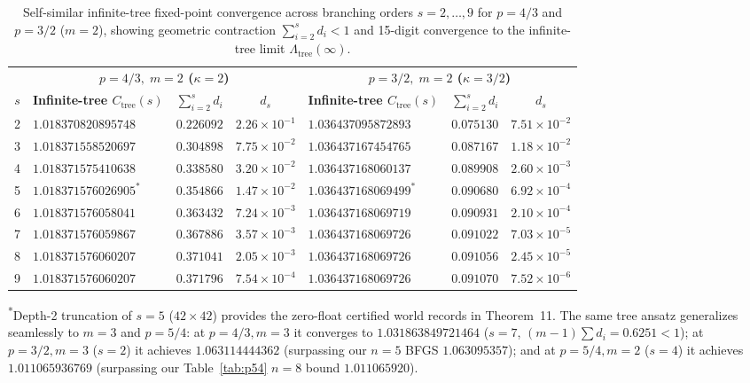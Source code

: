 \documentclass[10pt,letterpaper]{article}
\begin{document}
\begin{table}[htbp]
\centering
\caption{\small Self-similar infinite-tree fixed-point convergence across branching orders $s = 2,\dots,9$ for $p = 4/3$ and $p = 3/2$ ($m = 2$), showing geometric contraction $\sum_{i=2}^s d_i < 1$ and 15-digit convergence to the infinite-tree limit $\Lambda_{\mathrm{tree}}(\infty)$.}
\vspace{3pt}
\footnotesize
\begin{tabular}{@{}c | l c c | l c c@{}}
\toprule
 & \multicolumn{3}{c|}{\textbf{$p = 4/3,\; m = 2$ ($\kappa = 2$)}} & \multicolumn{3}{c}{\textbf{$p = 3/2,\; m = 2$ ($\kappa = 3/2$)}} \\
\textbf{$s$} & \textbf{Infinite-tree $C_{\mathrm{tree}}(s)$} & \textbf{$\sum_{i=2}^s d_i$} & \textbf{$d_s$} & \textbf{Infinite-tree $C_{\mathrm{tree}}(s)$} & \textbf{$\sum_{i=2}^s d_i$} & \textbf{$d_s$} \\
\midrule
2 & $1.018370820895748$ & $0.226092$ & $2.26\times 10^{-1}$ & $1.036437095872893$ & $0.075130$ & $7.51\times 10^{-2}$ \\
3 & $1.018371558520697$ & $0.304898$ & $7.75\times 10^{-2}$ & $1.036437167454765$ & $0.087167$ & $1.18\times 10^{-2}$ \\
4 & $1.018371575410638$ & $0.338580$ & $3.20\times 10^{-2}$ & $1.036437168060137$ & $0.089908$ & $2.60\times 10^{-3}$ \\
5 & $1.018371576026905^*$ & $0.354866$ & $1.47\times 10^{-2}$ & $1.036437168069499^*$ & $0.090680$ & $6.92\times 10^{-4}$ \\
6 & $1.018371576058041$ & $0.363432$ & $7.24\times 10^{-3}$ & $1.036437168069719$ & $0.090931$ & $2.10\times 10^{-4}$ \\
7 & $1.018371576059867$ & $0.367886$ & $3.57\times 10^{-3}$ & $1.036437168069726$ & $0.091022$ & $7.03\times 10^{-5}$ \\
8 & $1.018371576060207$ & $0.371041$ & $2.05\times 10^{-3}$ & $1.036437168069726$ & $0.091056$ & $2.45\times 10^{-5}$ \\
9 & $1.018371576060207$ & $0.371796$ & $7.54\times 10^{-4}$ & $1.036437168069726$ & $0.091070$ & $7.52\times 10^{-6}$ \\
\bottomrule
\end{tabular}
\vspace{4pt}
\par\parbox{0.96\textwidth}{\footnotesize\textsuperscript{*}Depth-2 truncation of $s = 5$ ($42\times 42$) provides the zero-float certified world records in Theorem~11. The same tree ansatz generalizes seamlessly to $m = 3$ and $p = 5/4$: at $p = 4/3, m = 3$ it converges to $1.031863849721464$ ($s = 7$, $(m-1)\sum d_i = 0.6251 < 1$); at $p = 3/2, m = 3$ ($s = 2$) it achieves $1.063114444362$ (surpassing our $n=5$ BFGS $1.063095357$); and at $p = 5/4, m = 2$ ($s = 4$) it achieves $1.011065936769$ (surpassing our Table~\ref{tab:p54} $n=8$ bound $1.011065920$).}
\label{tab:trees}
\end{table}
\end{document}
